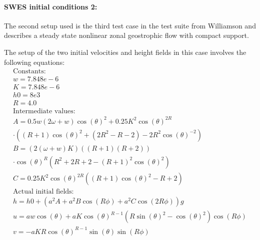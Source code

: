 \paragraph{SWES initial conditions 2:}
The second setup used is the third test case in the test suite from Williamson and describes a steady state nonlinear zonal geostrophic flow with compact support.

The setup of the two initial velocities and height fields in this case involves the following equations:
\begin{equation}
\label{eq:swes_ic2}
\begin{split}
\text{Constants:} \\
w = 7.848e-6 \\
K = 7.848e-6 \\
h0 = 8e3 \\
R = 4.0 \\
\text{Intermediate values:} \\
A = 0.5 w \left(2 \omega + w \right) \cos \left( \theta \right)^2 + 0.25 K^2 \cos\left(\theta\right)^{2 R} \\
\cdot \left( \left(R + 1\right) \cos \left( \theta \right)^2 + \left(2 R^2 - R - 2 \right) - 2 R^2 \cos \left(\theta \right)^{-2} \right) \\
B = \left(2 \left(\omega + w\right) K\right) \left(\left(R + 1\right) \left(R + 2\right)\right) \\
\cdot \cos\left(\theta \right) ^ R \left(R ^ 2 + 2 R + 2 - \left(R + 1\right) ^ 2 \cos\left(\theta\right) ^ 2\right) \\
C = 0.25 K ^ 2 \cos\left(\theta\right) ^{2 R} \left(\left(R + 1\right) \cos\left(\theta\right) ^ 2 - R + 2 \right) \\
\text{Actual initial fields:} \\
h = h0 + \left( a ^ 2 A + a ^ 2 B \cos\left(R \phi\right) + a ^ 2 C \cos \left(2 R \phi \right)\right)  g \\
u = a w \cos\left(\theta\right) + a K\cos\left(\theta\right) ^ {R - 1} \left(R \sin\left(\theta\right) ^ 2 - \cos\left(\theta\right) ^ 2\right) \cos\left(R \phi\right) \\
v = - a K R \cos\left(\theta\right) ^ {R - 1} \sin\left(\theta\right) \sin\left(R \phi\right)
\end{split}
\end{equation}


